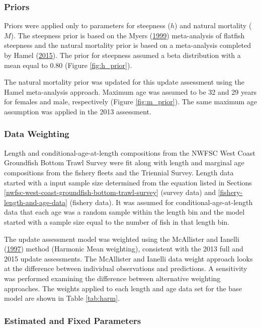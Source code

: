 \documentclass[12pt,]{article}
\begin{document}
\subsubsection{Priors}\label{priors}

Priors were applied only to parameters for steepness (\(h\)) and natural
mortality (\(M\)). The steepness prior is based on the Myers
(\protect\hyperlink{ref-myers_maximum_1999}{1999}) meta-analysis of
flatfish steepness and the natural mortality prior is based on a
meta-analysis completed by Hamel
(\protect\hyperlink{ref-hamel_method_2015}{2015}). The prior for
steepness assumed a beta distribution with a mean equal to 0.80 (Figure
\ref{fig:h_prior}).

The natural mortality prior was updated for this update assessment using
the Hamel meta-analysis approach. Maximum age was assumed to be 32 and
29 years for females and male, respectively (Figure \ref{fig:m_prior}).
The same maximum age assumption was applied in the 2013 assessment.

\subsubsection{Data Weighting}\label{data-weighting}

Length and conditional-age-at-length compositions from the NWFSC West
Coast Groundfish Bottom Trawl Survey were fit along with length and
marginal age compositions from the fishery fleets and the Triennial
Survey. Length data started with a input sample size determined from the
equation listed in Sections
\ref{nwfsc-west-coast-groundfish-bottom-trawl-survey} (survey data) and
\ref{fishery-length-and-age-data} (fishery data). It was assumed for
conditional-age-at-length data that each age was a random sample within
the length bin and the model started with a sample size equal to the
number of fish in that length bin.

The update assessment model was weighted using the McAllister and
Ianelli (\protect\hyperlink{ref-mcallister_bayesian_1997}{1997}) method
(Harmonic Mean weighting), consistent with the 2013 full and 2015 update
assessments. The McAllister and Ianelli data weight approach looks at
the difference between individual observations and predictions. A
sensitivity was performed examining the difference between alternative
weighting approaches. The weights applied to each length and age data
set for the base model are shown in Table \ref{tab:harm}.

\subsubsection{Estimated and Fixed
Parameters}\label{estimated-and-fixed-parameters}
\end{document}
